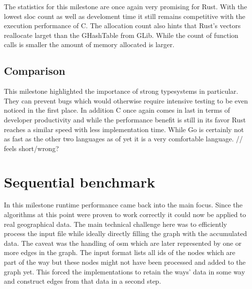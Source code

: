 The statistics for this milestone are once again very promising for Rust. With the lowest \gls{sloc} count as well as develoment time it still remains competitive with the execution performance of C. The allocation count also hints that Rust's vectors reallocate larget than the GHashTable from GLib. While the count of function calls is smaller the amount of memory allocated is larger.

\subsection{Comparison}
\label{subsec:Implementation::Verification::Comparison}

This milestone highlighted the importance of strong typesystems in particular. They can prevent bugs which would otherwise require intensive testing to be even noticed in the first place. In addition C once again comes in last in terms of developer productivity and while the performance benefit is still in its favor Rust reaches a similar speed with less implementation time. While Go is certainly not as fast as the other two languages as of yet it is a very comfortable language. // feels short/wrong?

\section{Sequential benchmark}
\label{sec:Implementation::SequentialBenchmark}

In this milestone runtime performance came back into the main focus. Since the algorithms at this point were proven to work correctly it could now be applied to real geographical data. The main technical challenge here was to efficiently process the input file while ideally directly filling the graph with the accumulated data. The caveat was the handling of \gls{osm}  which are later represented by one or more edges in the graph. The input format lists all ids of the nodes which are part of the way but these nodes might not have been processed and added to the graph yet. This forced the implementations to retain the ways' data in some way and construct edges from that data in a second step.

